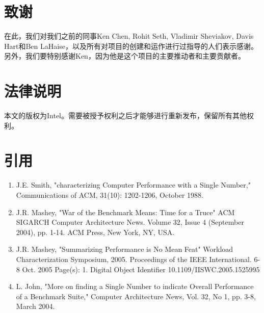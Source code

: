 \section*{致谢}
在此，我们对我们之前的同事Ken Chen, Rohit Seth, Vladimir Sheviakov, Davis Hart和Ben LaHaise，以及所有对项目的创建和运作进行过指导的人们表示感谢。另外，我们要特别感谢Ken，因为他是这个项目的主要推动者和主要贡献者。
\section*{法律说明}
本文的版权为Intel。需要被授予权利之后才能够进行重新发布，保留所有其他权利。
\section*{引用}

\begin{enumerate}[1)]
\item J.E. Smith, "characterizing Computer Performance with a Single Number," Communications of ACM, 31(10): 1202-1206, October 1988. 
\item J.R. Mashey, "War of the Benchmark Means: Time for a Truce" ACM SIGARCH Computer Architecture News. Volume 32, Issue 4 (September 2004), pp. 1-14. ACM Press, New York, NY, USA.
\item J.R. Mashey, "Summarizing Performance is No Mean Feat" Workload Characterization Symposium, 2005. Proceedings of the IEEE International. 6-8 Oct. 2005 Page(s): 1. Digital Object Identifier 10.1109/IISWC.2005.1525995
\item L. John, "More on finding a Single Number to indicate Overall Performance of a Benchmark Suite," Computer Architecture News, Vol. 32, No 1, pp. 3-8, March 2004.
\end{enumerate}
